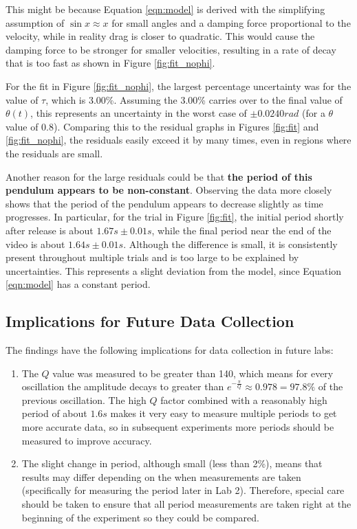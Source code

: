 \documentclass[aps,twocolumn,secnumarabic,nobalancelastpage,amsmath,amssymb,nofootinbib]{revtex4}
\begin{document}
This might be because Equation \ref{eqn:model} is derived with the simplifying assumption of \(\sin x \approx x\) for
small angles and a damping force proportional to the velocity, while in reality drag is closer to quadratic.
This would cause the damping force to be stronger for smaller velocities, resulting in a rate of decay that is too fast
as shown in Figure \ref{fig:fit_nophi}.

For the fit in Figure \ref{fig:fit_nophi}, the largest percentage uncertainty was for the value of \(\tau\), which is
3.00\%. Assuming the 3.00\% carries over to the final value of \(\theta(t)\), this represents an uncertainty in the
worst case of \(\pm 0.0240\si{rad}\) (for a \(\theta\) value of 0.8). Comparing this to the residual graphs in Figures
\ref{fig:fit} and \ref{fig:fit_nophi}, the residuals easily exceed it by many times, even in regions where the
residuals are small.

Another reason for the large residuals could be that \textbf{the period of this pendulum appears to be non-constant}.
Observing the data more closely shows that the period of the pendulum appears to decrease slightly as time progresses.
In particular, for the trial in Figure \ref{fig:fit}, the initial period shortly after release is about
\(1.67\si{s} \pm 0.01\si{s}\), while the final period near the end of the video is about \(1.64\si{s} \pm 0.01\si{s}\).
Although the difference is small, it is consistently present throughout multiple trials and is too large to be explained
by uncertainties. This represents a slight deviation from the model, since Equation \ref{eqn:model} has a constant
period.

\subsection{Implications for Future Data Collection}

The findings have the following implications for data collection in future labs:
\begin{enumerate}
    \item The \(Q\) value was measured to be greater than 140, which means for every oscillation the amplitude decays to
          greater than \(e^{-\frac{\pi}{Q}} \approx 0.978 = 97.8\%\) of the previous oscillation. The high \(Q\) factor
          combined with a reasonably high period of about \(1.6\si{s}\) makes it very easy to measure multiple periods
          to get more accurate data, so in subsequent experiments more periods should be measured to improve accuracy.
    \item The slight change in period, although small (less than 2\%), means that results may differ depending on the
          when measurements are taken (specifically for measuring the period later in Lab 2). Therefore, special care
          should be taken to ensure that all period measurements are taken right at the beginning of the experiment so
          they could be compared.
\end{enumerate}
\end{document}

